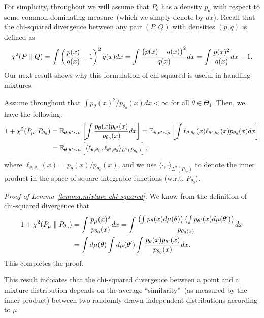 \documentclass[12pt]{article}
\begin{document}
	For simplicity, throughout we will assume that $P_\theta$ has a density $p_\theta$ with respect to some common dominating measure~(which we simply denote by $dx$). Recall that the chi-squared divergence between any pair $(P,Q)$ with densities $(p,q)$ is defined as 
	\begin{align}
	\chi^2(P\parallel Q) = \int \left(\frac{p(x)}{q(x)} - 1 \right)^2 q(x) dx = \int \frac{\big(p(x)-q(x)\big)^2}{q(x)} dx = \int \frac{p(x)^2}{q(x)} dx -1.  
	\end{align}	
	Our next result shows why this formulation of chi-squared is useful in handling mixtures. 

	\begin{lemma}
		\label{lemma:mixture-chi-squared}
		Assume throughout that $\int p_\theta(x)^2/p_{\theta_0}(x)dx < \infty$ for all $\theta \in \Theta_1$. Then, we have the following: 
		\begin{align}
			1 + \chi^2(P_\mu, P_{\theta_0}) &= \mathbb{E}_{\theta, \theta' \sim \mu}\left[ \int \frac{p_{\theta}(x) p_{\theta'}(x)}{p_{\theta_0}(x)} dx \right] = \mathbb{E}_{\theta, \theta' \sim \mu}\left[ \int \ell_{\theta, \theta_0}(x) \ell_{\theta', \theta_0}(x) p_{\theta_0}(x)dx \right] \\
			& = \mathbb{E}_{\theta, \theta' \sim \mu} \left[ \langle \ell_{\theta, \theta_0}, \ell_{\theta', \theta_0} \rangle_{L^2(P_{\theta_0})} \right], 
		\end{align}
		where $\ell_{\theta, \theta_0}(x) = p_\theta(x)/p_{\theta_0}(x)$, and we use $\langle \cdot, \cdot \rangle_{L^2(P_{\theta_0})}$ to denote the inner product in the space of square integrable functions (w.r.t. $P_{\theta_0}$).  
	\end{lemma}

	\emph{Proof of Lemma~\ref{lemma:mixture-chi-squared}.}
	We know from the definition of chi-squared divergence that 
	\begin{align}
		1 + \chi^2(P_\mu \parallel P_{\theta_0}) &= \int \frac{p_\mu(x)^2}{p_{\theta_0}(x)} dx = \int \frac{ \left(\int p_\theta(x) d\mu(\theta) \right) \left(\int p_{\theta'}(x) d\mu(\theta') \right)  }{p_{\theta_0(x)}} dx \\
		& = \int d\mu(\theta) \int d\mu(\theta') \int \frac{p_\theta(x) p_{\theta'}(x)}{p_{\theta_0}(x)} dx. 
	\end{align}
This completes the proof.  \hfill \qedsymbol


This result indicates that the chi-squared divergence between a point and a mixture distribution depends on the average ``similarity''~(as measured by the inner product) between two randomly drawn independent distributions according to $\mu$. 
\end{document}
